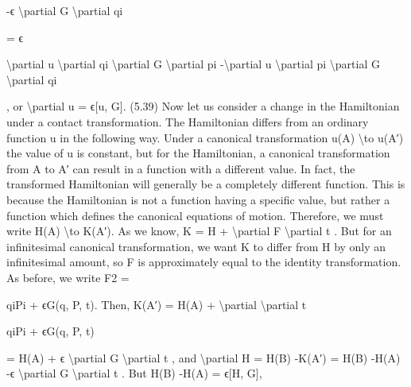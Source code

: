 -ϵ \textbackslash{}partial G
\textbackslash{}partial qi

= ϵ

\textbackslash{}partial u
\textbackslash{}partial qi
\textbackslash{}partial G
\textbackslash{}partial pi
-\textbackslash{}partial u
\textbackslash{}partial pi
\textbackslash{}partial G
\textbackslash{}partial qi

,
or
\textbackslash{}partial u = ϵ[u, G].
(5.39)
Now let us consider a change in the Hamiltonian under a contact transformation. The Hamiltonian differs from an ordinary function u in the following way.
Under a canonical transformation u(A) \textbackslash{}to u(A′) the value of u is constant, but
for the Hamiltonian, a canonical transformation from A to A′ can result in a
function with a different value. In fact, the transformed Hamiltonian will generally be a completely different function. This is because the Hamiltonian is
not a function having a specific value, but rather a function which defines the
canonical equations of motion. Therefore, we must write
H(A) \textbackslash{}to K(A′).
As we know,
K = H + \textbackslash{}partial F
\textbackslash{}partial t .
But for an infinitesimal canonical transformation, we want K to differ from H
by only an infinitesimal amount, so F is approximately equal to the identity
transformation. As before, we write
F2 =

qiPi + ϵG(q, P, t).
Then,
K(A′) = H(A) + \textbackslash{}partial
\textbackslash{}partial t

qiPi + ϵG(q, P, t)

= H(A) + ϵ \textbackslash{}partial G
\textbackslash{}partial t ,
and
\textbackslash{}partial H = H(B) -K(A′) = H(B) -H(A) -ϵ \textbackslash{}partial G
\textbackslash{}partial t .
But
H(B) -H(A) = ϵ[H, G],

